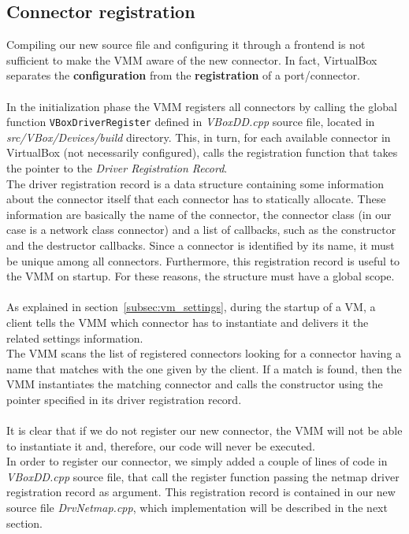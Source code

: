 \documentclass[a4paper, 12pt, titlepage]{report}
\begin{document}
\subsection{Connector registration} \label{subsec:registration}
Compiling our new source file and configuring it through a frontend is not sufficient to make the VMM aware of the new connector. In fact, VirtualBox separates the \textbf{configuration} from the \textbf{registration} of a port/connector.
\\
\\
In the initialization phase the VMM registers all connectors by calling the global function \texttt{VBoxDriverRegister} defined in \textit{VBoxDD.cpp} source file, located in \textit{src/VBox/Devices/build} directory. This, in turn, for each available connector in VirtualBox (not necessarily configured), calls the registration function that takes the pointer to the \textit{Driver Registration Record}.
\\
The driver registration record is a data structure containing some information about the connector itself that each connector has to statically allocate. These information are basically the name of the connector, the connector class (in our case is a network class connector) and a list of callbacks, such as the constructor and the destructor callbacks. Since a connector is identified by its name, it must be unique among all connectors. Furthermore, this registration record is useful to the VMM on startup. For these reasons, the structure must have a global scope.
\\
\\
As explained in section~\ref{subsec:vm_settings}, during the startup of a VM, a client tells the VMM which connector has to instantiate and delivers it the related settings information.
\\
The VMM scans the list of registered connectors looking for a connector having a name that matches with the one given by the client. If a match is found, then the VMM instantiates the matching connector and calls the constructor using the pointer specified in its driver registration record.
\\
\\
It is clear that if we do not register our new connector, the VMM will not be able to instantiate it and, therefore, our code will never be executed.
\\
In order to register our connector, we simply added a couple of lines of code in \textit{VBoxDD.cpp} source file, that call the register function passing the netmap driver registration record as argument. This registration record is contained in our new source file \textit{DrvNetmap.cpp}, which implementation will be described in the next section.
\end{document}
